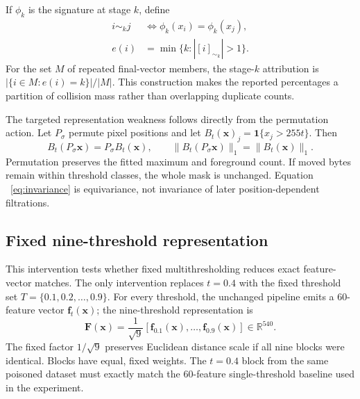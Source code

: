 \documentclass[conference]{IEEEtran}
\newcommand{\vect}[1]{\boldsymbol{#1}}
\begin{document}
If $\phi_k$ is the signature at stage $k$, define
\begin{equation}
\begin{aligned}
 i\sim_k j &\iff \phi_k(x_i)=\phi_k(x_j),\\
 e(i) &=\min\{k:|[i]_{\sim_k}|>1\}.
\end{aligned}
\label{eq:earliest}
\end{equation}
For the set $M$ of repeated final-vector members, the stage-$k$ attribution is
$|\{i\in M:e(i)=k\}|/|M|$. This construction makes the reported percentages a
partition of collision mass rather than overlapping duplicate counts.

The targeted representation weakness follows directly from the permutation
action. Let $P_\sigma$ permute pixel positions and let
$B_t(\vect{x})_j=\mathbf{1}\{x_j>255t\}$. Then
\begin{equation}
 B_t(P_\sigma\vect{x})=P_\sigma B_t(\vect{x}), \qquad
 \|B_t(P_\sigma\vect{x})\|_1=\|B_t(\vect{x})\|_1 .
 \label{eq:invariance}
\end{equation}
Permutation preserves the fitted maximum and foreground count. If moved bytes
remain within threshold classes, the whole mask is unchanged. Equation
~\eqref{eq:invariance} is equivariance, not invariance of later
position-dependent filtrations.

\subsection{Fixed nine-threshold representation}
\label{sec:stack}
This intervention tests whether fixed multithresholding reduces exact feature-vector matches.
The only intervention replaces $t=0.4$ with the fixed threshold set
$T=\{0.1,0.2,\ldots,0.9\}$. For every threshold, the unchanged pipeline emits a
60-feature vector $\vect{f}_t(\vect{x})$; the nine-threshold representation is
\begin{equation}
 \vect{F}(\vect{x})=\frac{1}{\sqrt{9}}
 [\vect{f}_{0.1}(\vect{x}),\ldots,\vect{f}_{0.9}(\vect{x})]\in\mathbb{R}^{540}.
 \label{eq:stack}
\end{equation}
The fixed factor $1/\sqrt{9}$ preserves Euclidean distance scale if all nine
blocks were identical. Blocks have equal, fixed weights. The $t=0.4$ block from
the same poisoned dataset must exactly match the 60-feature single-threshold
baseline used in the experiment.
\end{document}
